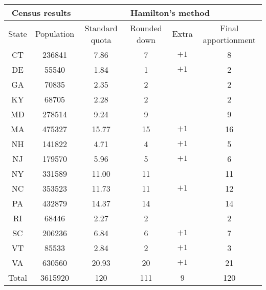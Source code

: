 \documentclass[10pt]{standalone}
\begin{document}
~ 

\begin{tabular}{|cc|cccc|}
\hline
\multicolumn{2}{|c}{\textbf{Census results}} & \multicolumn{4}{|c|}{\textbf{Hamilton's method}}  \\ \hline
State & Population & Standard quota & Rounded down & Extra & Final apportionment \\ \hline
CT & 236841 & 7.86 & 7 & $+1$ & 8 \\ 
DE & 55540  & 1.84 & 1 & $+1$ & 2 \\ 
GA & 70835  & 2.35 & 2 & ~ & 2 \\ 
KY & 68705  & 2.28 & 2 & ~ & 2 \\ 
MD & 278514 & 9.24 & 9 & ~ & 9 \\ 
MA & 475327 & 15.77 & 15 & $+1$ & 16 \\ 
NH & 141822 & 4.71 & 4 & $+1$ & 5 \\ 
NJ & 179570 & 5.96 & 5 & $+1$ & 6 \\ 
NY & 331589 & 11.00 & 11 & ~ & 11 \\ 
NC & 353523 & 11.73 & 11 & $+1$ & 12 \\ 
PA & 432879 & 14.37 & 14 & ~ & 14 \\ 
RI & 68446  & 2.27 & 2 & ~ & 2 \\ 
SC & 206236 & 6.84 & 6 & $+1$ & 7 \\ 
VT & 85533  & 2.84 & 2 & $+1$ & 3 \\ 
VA & 630560 & 20.93 & 20 & $+1$ & 21 \\ \hline
Total & 3615920 & 120 & 111 & 9 & 120 \\ \hline
\end{tabular}~
\end{document}
